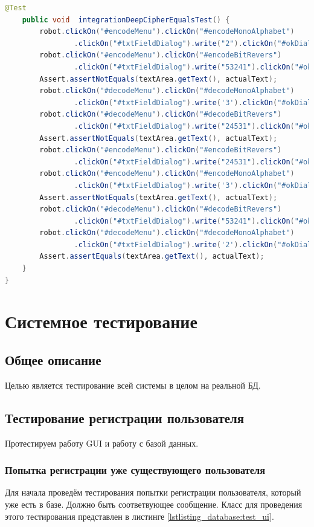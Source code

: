\documentclass[a4paper,12pt]{article}
\begin{document}
\begin{lstlisting}[language=java, caption=класс MainWindowUiIntegrationTest, label=listing_mainWindow:MainWindowUiIntegrationTestn]
    @Test
    public void  integrationDeepCipherEqualsTest() {
        robot.clickOn("#encodeMenu").clickOn("#encodeMonoAlphabet")
                .clickOn("#txtFieldDialog").write("2").clickOn("#okDialog");
        robot.clickOn("#encodeMenu").clickOn("#encodeBitRevers")
                .clickOn("#txtFieldDialog").write("53241").clickOn("#okDialog");
        Assert.assertNotEquals(textArea.getText(), actualText);
        robot.clickOn("#decodeMenu").clickOn("#decodeMonoAlphabet")
                .clickOn("#txtFieldDialog").write('3').clickOn("#okDialog");
        robot.clickOn("#decodeMenu").clickOn("#decodeBitRevers")
                .clickOn("#txtFieldDialog").write("24531").clickOn("#okDialog");
        Assert.assertNotEquals(textArea.getText(), actualText);
        robot.clickOn("#encodeMenu").clickOn("#encodeBitRevers")
                .clickOn("#txtFieldDialog").write("24531").clickOn("#okDialog");
        robot.clickOn("#encodeMenu").clickOn("#encodeMonoAlphabet")
                .clickOn("#txtFieldDialog").write('3').clickOn("#okDialog");
        Assert.assertNotEquals(textArea.getText(), actualText);
        robot.clickOn("#decodeMenu").clickOn("#decodeBitRevers")
                .clickOn("#txtFieldDialog").write("53241").clickOn("#okDialog");
        robot.clickOn("#decodeMenu").clickOn("#decodeMonoAlphabet")
                .clickOn("#txtFieldDialog").write('2').clickOn("#okDialog");
        Assert.assertEquals(textArea.getText(), actualText);
    }
}
\end{lstlisting}

\newpage \section{Системное тестирование}
\subsection{Общее описание}
Целью является тестирование всей системы в целом на реальной БД.

\newpage \subsection{Тестирование регистрации пользователя}
Протестируем работу GUI и работу с базой данных.  

\subsubsection{Попытка регистрации уже существующего пользователя}
Для начала проведём тестирования попытки регистрации пользователя, который уже есть в базе. Должно быть соответвующее сообщение. Класс для проведения этого тестирования представлен в листинге \ref{lstlisting_database:test_ui}.
\end{document}
